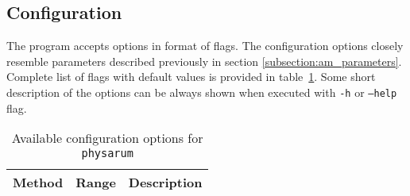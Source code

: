 \subsection{Configuration}

The program accepts options in format of flags. The configuration options closely resemble parameters described previously in section \ref{subsection:am_parameters}. Complete list of flags with default values is provided in table~\ref{table:pi_options}. Some short description of the options can be always shown when executed with \texttt{-h} or \texttt{--help} flag.

\begin{table}[h]
  \centering
  \caption{Available configuration options for \texttt{physarum}}
  \label{table:pi_options}
  \begin{tabularx}{\textwidth}{r|c|X}
            Method                & Range               & Description \\ \hline
  \end{tabularx}
\end{table}


